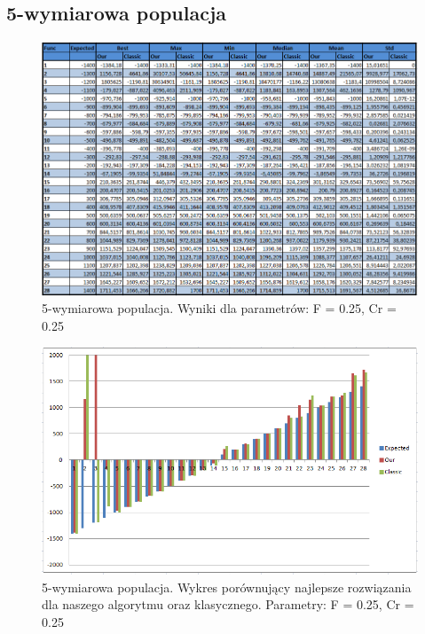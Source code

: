 \documentclass[a4paper]{article}
\begin{document}
\subsection{5-wymiarowa populacja}
\begin{figure}
\centering
\includegraphics[width=\textwidth]{F25Cr25L5tab.png}
\caption{5-wymiarowa populacja. Wyniki dla parametrów: F = 0.25, Cr = 0.25}
\end{figure}

\begin{figure}
\centering
\includegraphics[width=\textwidth]{F25Cr25L5chart.png}
\caption{5-wymiarowa populacja. Wykres porównujący najlepsze rozwiązania dla naszego algorytmu oraz klasycznego. Parametry: F = 0.25, Cr = 0.25}
\end{figure}
\end{document}

